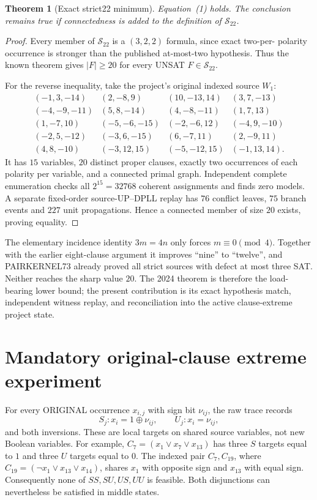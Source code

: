 \documentclass[10pt]{article}
\newtheorem{theorem}{Theorem}
\begin{document}
\begin{theorem}[Exact strict22 minimum]
Equation~\textup{(1)} holds.  The conclusion remains true if connectedness is
added to the definition of $\mathcal S_{22}$.
\end{theorem}
\begin{proof}
Every member of $\mathcal S_{22}$ is a $(3,2,2)$ formula, since exact two-per-
polarity occurrence is stronger than the published at-most-two hypothesis.
Thus the known theorem gives $|F|\ge20$ for every UNSAT $F\in\mathcal S_{22}$.

For the reverse inequality, take the project's original indexed source $W_1$:
\[
\begin{array}{llll}
(-1,3,-14)&(2,-8,9)&(10,-13,14)&(3,7,-13)\\
(-4,-9,-11)&(5,8,-14)&(4,-8,-11)&(1,7,13)\\
(1,-7,10)&(-5,-6,-15)&(-2,-6,12)&(-4,9,-10)\\
(-2,5,-12)&(-3,6,-15)&(6,-7,11)&(2,-9,11)\\
(4,8,-10)&(-3,12,15)&(-5,-12,15)&(-1,13,14).
\end{array}
\]
It has $15$ variables, $20$ distinct proper clauses, exactly two occurrences
of each polarity per variable, and a connected primal graph.  Independent
complete enumeration checks all $2^{15}=32768$ coherent assignments and finds
zero models.  A separate fixed-order source-UP--DPLL replay has $76$ conflict
leaves, $75$ branch events and $227$ unit propagations.  Hence a connected
member of size $20$ exists, proving equality.
\end{proof}

The elementary incidence identity $3m=4n$ only forces $m\equiv0\pmod4$.
Together with the earlier eight-clause argument it improves ``nine'' to
``twelve'', and PAIRKERNEL73 already proved all strict sources with defect at
most three SAT.  Neither reaches the sharp value $20$.  The 2024 theorem is
therefore the load-bearing lower bound; the present contribution is its exact
hypothesis match, independent witness replay, and reconciliation into the
active clause-extreme project state.

\section{Mandatory original-clause extreme experiment}
For every ORIGINAL occurrence $x_{i,j}$ with sign bit $\nu_{ij}$, the raw trace
records
\[
 S_j:x_i=1\oplus\nu_{ij},\qquad U_j:x_i=\nu_{ij},
\]
and both inversions.  These are local targets on shared source variables, not
new Boolean variables.  For example,
$C_7=(x_1\vee x_7\vee x_{13})$ has three $S$ targets equal to $1$ and three
$U$ targets equal to $0$.  The indexed pair $C_7,C_{19}$, where
$C_{19}=(\neg x_1\vee x_{13}\vee x_{14})$, shares $x_1$ with opposite sign
and $x_{13}$ with equal sign.  Consequently none of $SS,SU,US,UU$ is feasible.
Both disjunctions can nevertheless be satisfied in middle states.
\end{document}

